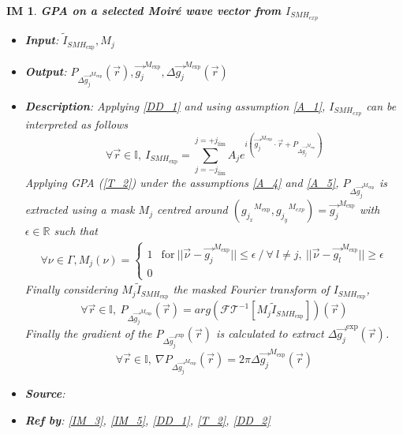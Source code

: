 \documentclass[12pt]{article}
\newtheorem{IM}{IM}
\begin{document}
\begin{IM}
\label{IM_2}
\noindent\colorbox{shadecolorIM}{\normalfont \textbf{GPA on a selected Moir{\'e} wave vector from $I_{SMH_{exp}}$}}
\normalfont
\begin{itemize}
\item \textbf{Input}: $\widetilde{I}_{\mathit{SMH}_{\text{exp}}}, M_j$
\item \textbf{Output}: $P_{\Delta \overrightarrow{g_{j}}^{M_{\text{exp}}}}(\vec{r}), \overrightarrow{g_{j}}^{M_{\text{exp}}}, \Delta \overrightarrow{g_{j}}^{M_{\text{exp}}}(\vec{r})$
\item \textbf{Description}: Applying \cref{DD_1} and using assumption \cref{A_1}, $I_{SMH_{exp}}$ can be interpreted as follows
\begin{equation}
\forall \vec{r} \in \mathbb{I},\ I_{\mathit{SMH}_{\text{exp}}}=\sum_{j=-j_{\text{lim}}}^{j=+j_{\text{lim}}}A_je^{i(\overrightarrow{g_{j}}^{M_{\text{exp}}}\cdot\vec{r}+P_{\Delta \overrightarrow{g_{j}}^{M_{\text{exp}}}})}
\end{equation}
Applying GPA (\cref{T_2}) under the assumptions \cref{A_4} and \cref{A_5}, $P_{\Delta \overrightarrow{g_{j}}^{M_{\text{exp}}}}$ is extracted using a mask $M_j$ centred around $({g_{j_x}}^{M_{\text{exp}}},{g_{j_y}}^{M_{exp}})=\overrightarrow{g_{j}}^{M_{\text{exp}}}$ with $\epsilon \in \mathbb{R}$ such that
\begin{equation}
\begin{gathered}
\forall \nu \in \Gamma, M_j(\nu) = 
\begin{cases}
1 & \text{for} \ ||\vec{\nu}-\overrightarrow{g_{j}}^{M_{\text{exp}}}||\leq\epsilon \ / \ \forall \ l\neq j, \ ||\vec{\nu}-\overrightarrow{g_{l}}^{M_{\text{exp}}}||\geq \epsilon \\
0
\end{cases}
\end{gathered}
\end{equation}
Finally considering $M_j\widetilde{I}_{\mathit{SMH}_{\text{exp}}}$ the masked Fourier transform of $I_{\mathit{SMH}_{\text{exp}}}$,
\begin{equation}
\forall \vec{r} \in \mathbb{I},\ P_{\Delta \overrightarrow{g_{j}}^{M_{\text{exp}}}}(\vec{r})=arg(\mathcal{FT}^{-1}[M_j\widetilde{I}_{\mathit{SMH}_{\text{exp}}}])(\vec{r})
\end{equation}
Finally the gradient of the $P_{\Delta \overrightarrow{g_{j}}^{\text{exp}}}(\vec{r})$ is calculated to extract ${\Delta \overrightarrow{g_{j}}^{\text{exp}}}(\vec{r})$.
\begin{equation}
\forall \vec{r} \in \mathbb{I},\ \nabla P_{\Delta \overrightarrow{g_{j}}^{M_{\text{exp}}}}(\vec{r})=2\pi\Delta \overrightarrow{g_{j}}^{M_{\text{exp}}}(\vec{r})
\end{equation}
\item \textbf{Source}: \cite{Hytch1998}
\item \textbf{Ref by}: \cref{IM_3}, \cref{IM_5}, \cref{DD_1}, \cref{T_2}, \cref{DD_2}
\end{itemize}
\end{IM}
\end{document}
